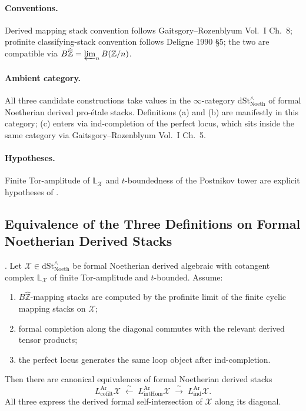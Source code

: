 \paragraph{Conventions.} Derived mapping stack
convention follows Gaitsgory--Rozenblyum Vol.~I Ch.~8; profinite
classifying-stack convention follows Deligne 1990 \S 5; the two are
compatible via
\(B\widehat{\mathbb{Z}}=\varprojlim_{n}B(\mathbb{Z}/n)\).

\paragraph{Ambient category.} All three candidate
constructions take values in the \(\infty\)-category
\(\mathrm{dSt}^{\wedge}_{\mathrm{Noeth}}\) of formal Noetherian
derived pro-\'etale stacks. Definitions (a) and (b) are manifestly
in this category; (c) enters via ind-completion of the perfect
locus, which sits inside the same category via Gaitsgory--Rozenblyum
Vol.~I Ch.~5.

\paragraph{Hypotheses.} Finite Tor-amplitude of
\(\mathbb{L}_{\mathcal{X}}\) and \(t\)-boundedness of the Postnikov
tower are explicit hypotheses of
.

\subsection{Equivalence of the Three Definitions on Formal Noetherian Derived Stacks}

\begin{theorem}
\label{v4-arith:bzn-rcompletion:thm:R3-three-agree}
\ClaimStatusProvedHereConditional. Let \(\mathcal{X}\in\mathrm{dSt}^{\wedge}_{\mathrm{Noeth}}\)
be formal Noetherian derived algebraic with cotangent complex
\(\mathbb{L}_{\mathcal{X}}\) of finite Tor-amplitude and
\(t\)-bounded. Assume:
\begin{enumerate}
\item \(B\widehat{\mathbb Z}\)-mapping stacks are computed by the
profinite limit of the finite cyclic mapping stacks on \(\mathcal X\);
\item formal completion along the diagonal commutes with the relevant
derived tensor products;
\item the perfect locus generates the same loop object after
ind-completion.
\end{enumerate}
Then there are canonical equivalences of formal
Noetherian derived stacks
\begin{equation}
\label{v4-arith:bzn-rcompletion:eq:three-agree}
L^{\mathrm{Ar}}_{\mathrm{cofilt}}\mathcal{X}
\;\xleftarrow{\;\sim\;}\;L^{\mathrm{Ar}}_{\mathrm{intHom}}\mathcal{X}
\;\xrightarrow{\;\sim\;}\;L^{\mathrm{Ar}}_{\mathrm{ind}}\mathcal{X}.
\end{equation}
All three express the derived formal self-intersection of
\(\mathcal{X}\) along its diagonal.
\end{theorem}

